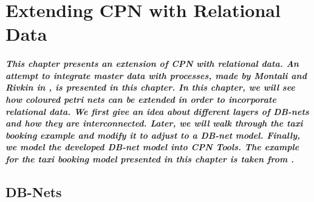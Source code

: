 \graphicspath{{./images/DBN/}}
\chapter{Extending CPN with Relational Data}
\label{ch:EXT_CPN_RDB}
\paragraph*{\textnormal{This chapter presents an extension of CPN with relational data. An attempt to integrate master data with processes, made by Montali and Rivkin in \cite{DBLP:journals/corr/DBNets}, is presented in this chapter. In this chapter, we will see how coloured petri nets can be extended in order to incorporate relational data. We first give an idea about different layers of DB-nets and how they are interconnected. Later, we will walk through the taxi booking example and modify it to adjust to a DB-net model. Finally, we model the developed DB-net model into CPN Tools. The example for the taxi booking model presented in this chapter is taken from \cite{DBLP:journals/corr/DBNets}.}}

\section{DB-Nets}
